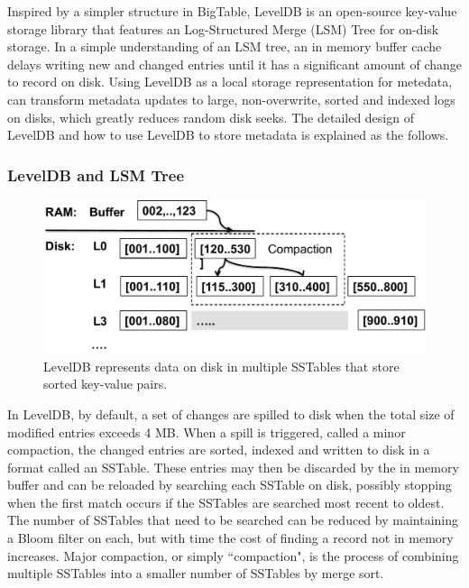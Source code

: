 Inspired by a simpler structure in BigTable\citep{BigTable}, 
LevelDB \citep{LevelDB} is an open-source key-value storage library
that features an Log-Structured Merge (LSM) Tree \citep{ONeil1996} for on-disk storage.
In a simple understanding of an LSM tree, an in memory buffer cache delays 
writing new and changed entries until it has a significant amount of change to record on disk.
Using LevelDB as a local storage representation for metedata, 
can transform metadata updates to large, non-overwrite, sorted and indexed logs on disks,
which greatly reduces random disk seeks.
The detailed design of LevelDB and how to use LevelDB to store metadata is explained as the follows.

\subsubsection*{LevelDB and LSM Tree}

\begin{figure}[!ht]
\centering
\includegraphics[scale=0.4]{figs/leveldb}
\caption{LevelDB represents data on disk in multiple SSTables that store sorted key-value pairs.}
\label{fig:leveldb}
\end{figure}


In LevelDB, by default, a set of changes are spilled to disk when the total size of modified entries exceeds 4 MB.  When a spill is triggered, called a minor compaction, the changed entries are sorted, indexed and written to disk in a format called an SSTable\citep{BigTable}.  These entries may then be discarded by the in memory buffer and can be reloaded by searching each SSTable on disk, possibly stopping when the first match occurs if the SSTables are searched most recent to oldest.  The number of SSTables that need to be searched can be reduced by maintaining a Bloom filter\citep{bloomfilter} on each, but with time the cost of finding a record not in memory increases.  Major compaction, or simply ``compaction", is the process of combining multiple SSTables into a smaller number of SSTables by merge sort. 

